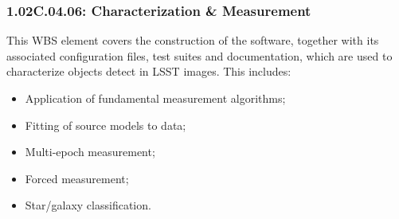 \subsubsection*{1.02C.04.06: Characterization \& Measurement}

This WBS element covers the construction of the software, together with
its associated configuration files, test suites and documentation, which
are used to characterize objects detect in LSST images. This includes:

\begin{itemize}
\item{Application of fundamental measurement algorithms;}
\item{Fitting of source models to data;}
\item{Multi-epoch measurement;}
\item{Forced measurement;}
\item{Star/galaxy classification.}
\end{itemize}
